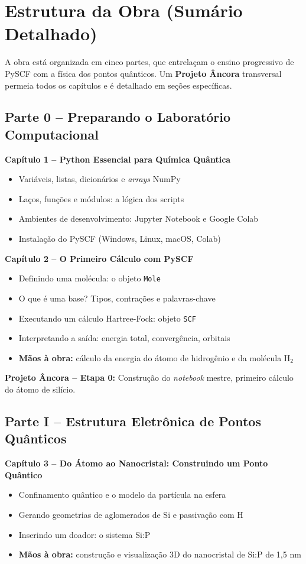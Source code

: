 \documentclass[12pt,a4paper]{article}
\begin{document}
	\section{Estrutura da Obra (Sumário Detalhado)}
	
	A obra está organizada em cinco partes, que entrelaçam o ensino progressivo de PySCF com a física dos pontos quânticos. Um \textbf{Projeto Âncora} transversal permeia todos os capítulos e é detalhado em seções específicas.
	
	\subsection*{Parte 0 -- Preparando o Laboratório Computacional}
	
	\textbf{Capítulo 1 -- Python Essencial para Química Quântica}
	\begin{itemize}
		\item Variáveis, listas, dicionários e \emph{arrays} NumPy
		\item Laços, funções e módulos: a lógica dos scripts
		\item Ambientes de desenvolvimento: Jupyter Notebook e Google Colab
		\item Instalação do PySCF (Windows, Linux, macOS, Colab)
	\end{itemize}
	
	\textbf{Capítulo 2 -- O Primeiro Cálculo com PySCF}
	\begin{itemize}
		\item Definindo uma molécula: o objeto \texttt{Mole}
		\item O que é uma base? Tipos, contrações e palavras-chave
		\item Executando um cálculo Hartree-Fock: objeto \texttt{SCF}
		\item Interpretando a saída: energia total, convergência, orbitais
		\item \textbf{Mãos à obra:} cálculo da energia do átomo de hidrogênio e da molécula H$_2$
	\end{itemize}
	
	\textbf{Projeto Âncora -- Etapa 0:} Construção do \emph{notebook} mestre, primeiro cálculo do átomo de silício.
	
	\subsection*{Parte I -- Estrutura Eletrônica de Pontos Quânticos}
	
	\textbf{Capítulo 3 -- Do Átomo ao Nanocristal: Construindo um Ponto Quântico}
	\begin{itemize}
		\item Confinamento quântico e o modelo da partícula na esfera
		\item Gerando geometrias de aglomerados de Si e passivação com H
		\item Inserindo um doador: o sistema Si:P
		\item \textbf{Mãos à obra:} construção e visualização 3D do nanocristal de Si:P de 1,5 nm
	\end{itemize}
	
\end{document}
